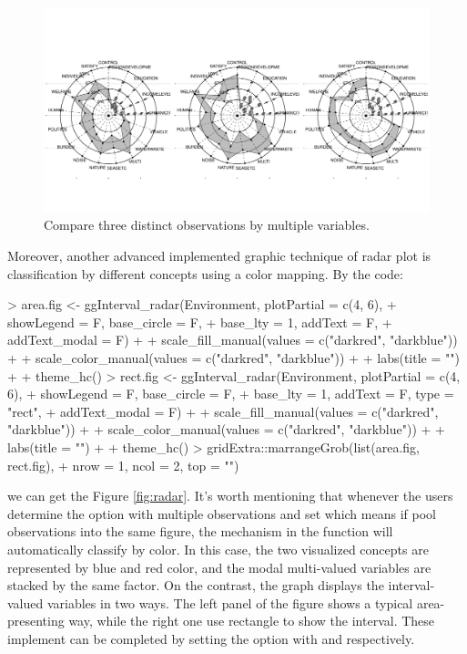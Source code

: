 \documentclass[article]{jss}
\begin{document}
\begin{figure}[htbp]
\centering
\includegraphics[trim=0cm 3cm 0cm 4.5cm,width=1\textwidth, clip]{radar_3obs.pdf} 
\caption{\label{fig:radar_3obs} Compare three distinct observations by multiple variables.}
\end{figure}

Moreover, another advanced implemented graphic technique of radar plot is classification by different concepts using a color mapping. By the code:
\begin{Schunk}
\begin{Sinput}
> area.fig <- ggInterval_radar(Environment, plotPartial = c(4, 6),
+                              showLegend = F, base_circle = F,
+                              base_lty = 1, addText = F,
+                              addText_modal = F) +
+             scale_fill_manual(values = c("darkred", "darkblue")) +
+             scale_color_manual(values = c("darkred", "darkblue")) +
+             labs(title = "") +
+             theme_hc()
> rect.fig <- ggInterval_radar(Environment, plotPartial = c(4, 6),
+                              showLegend = F, base_circle = F,
+                              base_lty = 1, addText = F, type = "rect",
+                              addText_modal = F) +
+             scale_fill_manual(values = c("darkred", "darkblue")) +
+             scale_color_manual(values = c("darkred", "darkblue")) +
+             labs(title = "") +
+             theme_hc()
> gridExtra::marrangeGrob(list(area.fig, rect.fig), 
+                         nrow = 1, ncol = 2, top = "")
\end{Sinput}
\end{Schunk}

we can get the Figure \ref{fig:radar}. It's worth mentioning that whenever the users determine the option  with multiple observations and set  which means if pool observations into the same figure, the mechanism in the function will automatically classify by color. In this case, the two visualized concepts are represented by blue and red color, and the modal multi-valued variables are stacked by the same factor. On the contrast, the graph displays the interval-valued variables in two ways. The left panel of the figure shows a typical area-presenting way, while the right one use rectangle to show the interval. These implement can be completed by setting the option  with  and  respectively.
\end{document}
